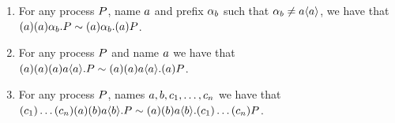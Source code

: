\begin{proposition}
\begin{enumerate}
\item For any process $P$, name $a$ and prefix $\alpha_b$ such that $\alpha_b\neq a\langle a\rangle$, we have that  $(a)(a)\alpha_b.P \sim (a)\alpha_b.(a)P$.
\item For any process $P$ and name $a$ %
we have that $(a)(a)(a)a\langle a\rangle.P \sim (a)(a)a\langle a\rangle.(a)P$.
\item For any process $P$, names $a, b, c_1, \ldots, c_n$ %
we have that $(c_1)\ldots(c_n)(a)(b)a\langle b\rangle.P \sim (a)(b)a\langle b\rangle.(c_1)\ldots(c_n)P$.

\end{enumerate}
\end{proposition}


